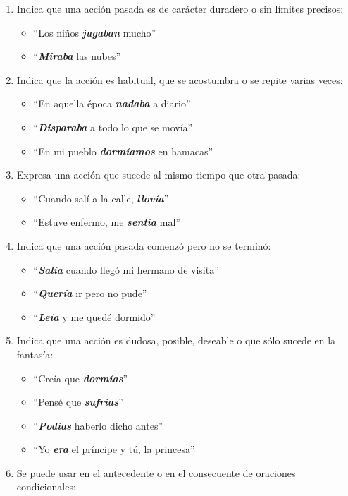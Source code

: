 \documentclass[14pt]{extarticle}
\newcommand{\marcatexto}[1]{\textbf{\textit{#1}}}
\begin{document}
\begin{enumerate}[label=\alph*)]
\item Indica que una acción pasada es de carácter duradero o sin límites precisos:
\begin{itemize}
\item \enquote{Los niños \marcatexto{jugaban} mucho}
\item \enquote{\marcatexto{Miraba} las nubes}
\end{itemize}
\item Indica que la acción es habitual, que se acostumbra o se repite varias veces:
\begin{itemize}
\item \enquote{En aquella época \marcatexto{nadaba} a diario}
\item \enquote{\marcatexto{Disparaba} a todo lo que se movía}
\item \enquote{En mi pueblo \marcatexto{dormíamos} en hamacas}
\end{itemize}
\item Expresa una acción que sucede al mismo tiempo que otra pasada:
\begin{itemize}
\item \enquote{Cuando salí a la calle, \marcatexto{llovía}}
\item \enquote{Estuve enfermo, me \marcatexto{sentía} mal}
\end{itemize}
\item Indica que una acción pasada comenzó pero no se terminó:
\begin{itemize}
\item \enquote{\marcatexto{Salía} cuando llegó mi hermano de visita}
\item \enquote{\marcatexto{Quería} ir pero no pude}
\item \enquote{\marcatexto{Leía} y me quedé dormido}
\end{itemize}
\item Indica que una acción es dudosa, posible, deseable o que sólo sucede en la fantasía:
\begin{itemize}
\item \enquote{Creía que \marcatexto{dormías}}
\item \enquote{Pensé que \marcatexto{sufrías}}
\item \enquote{\marcatexto{Podías} haberlo dicho antes}
\item \enquote{Yo \marcatexto{era} el príncipe y tú, la princesa}
\end{itemize}
\item Se puede usar en el antecedente o en el consecuente de oraciones condicionales:

\end{enumerate}
\end{document}

